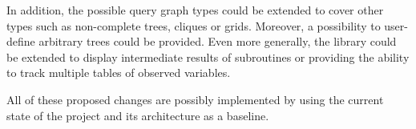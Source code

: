 In addition, the possible query graph types could be extended to cover other types such as non-complete trees, cliques or grids. Moreover, a possibility to user-define arbitrary trees could be provided. Even more generally, the library could be extended to display intermediate results of subroutines or providing the ability to track multiple tables of observed variables.

All of these proposed changes are possibly implemented by using the current state of the project and its architecture as a baseline.